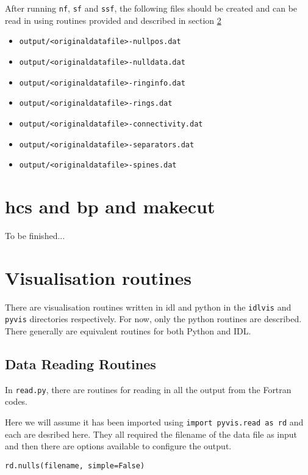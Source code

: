 \documentclass[12pt]{article}
\begin{document}
      After running \texttt{nf}, \texttt{sf} and \texttt{ssf}, the following files should be created and can be read in using routines provided and described in section \ref{sec:vis}
      \begin{itemize}
        \item \texttt{output/<originaldatafile>-nullpos.dat}
        \item \texttt{output/<originaldatafile>-nulldata.dat}
        \item \texttt{output/<originaldatafile>-ringinfo.dat}
        \item \texttt{output/<originaldatafile>-rings.dat}
        \item \texttt{output/<originaldatafile>-connectivity.dat}
        \item \texttt{output/<originaldatafile>-separators.dat}
        \item \texttt{output/<originaldatafile>-spines.dat}
      \end{itemize}

  \section{hcs and bp and makecut}

  To be finished...

  \section{Visualisation routines}
  \label{sec:vis}

    There are visualisation routines written in idl and python in the \texttt{idlvis} and \texttt{pyvis} directories respectively. For now, only the python routines are described. There generally are equivalent routines for both Python and IDL.

    \subsection{Data Reading Routines}

      In \texttt{read.py}, there are routines for reading in all the output from the Fortran codes.

      Here we will assume it has been imported using \texttt{import pyvis.read as rd} and each are desribed here. They all required the filename of the data file as input and then there are options available to configure the output.

      \texttt{rd.nulls(filename, simple=False)}
\end{document}
